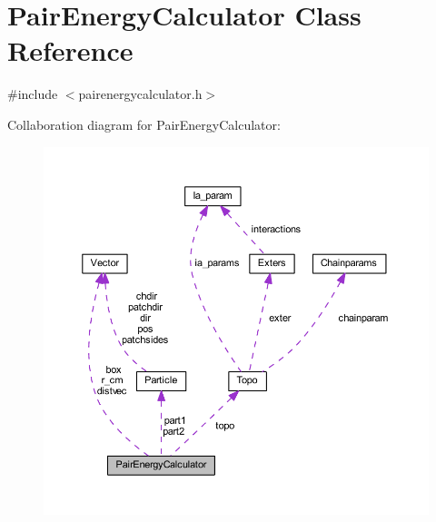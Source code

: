 \hypertarget{class_pair_energy_calculator}{\section{Pair\+Energy\+Calculator Class Reference}
\label{class_pair_energy_calculator}
}


{\ttfamily \#include $<$pairenergycalculator.\+h$>$}



Collaboration diagram for Pair\+Energy\+Calculator\+:\nopagebreak
\begin{figure}[H]
\begin{center}
\leavevmode
\includegraphics[width=350pt]{class_pair_energy_calculator__coll__graph}
\end{center}
\end{figure}
